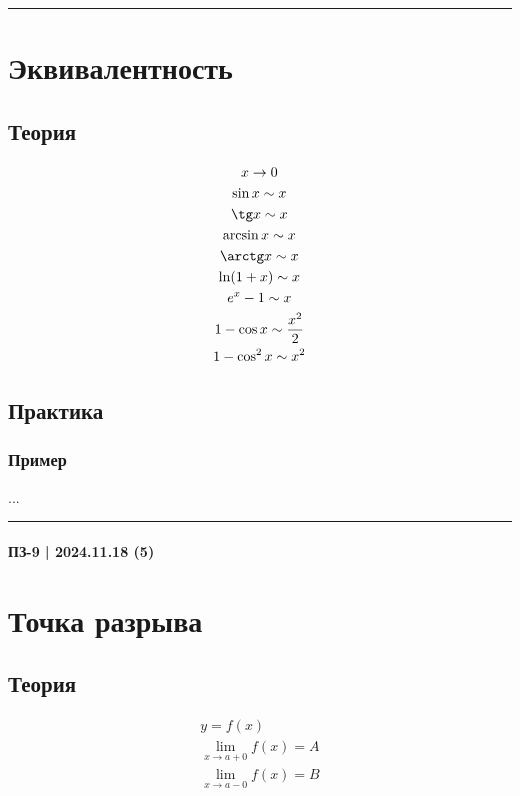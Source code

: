 \documentclass{article}
\begin{document}
\par\noindent\rule{\textwidth}{1pt}
\section{Эквивалентность}

\subsection{Теория}
\begin{gather*}
    x \to 0 \\
    \sin x       \sim x \\
    \tg x        \sim x \\
    \arcsin x    \sim x \\
    \arctg x     \sim x \\
    \ln(1 + x)   \sim x \\
    e^x - 1      \sim x \\
    1 - \cos x   \sim \frac{x^2}{2} \\
    1 - \cos^2 x \sim x^2
\end{gather*}


\subsection{Практика}

\subsubsection{Пример}
...



\par\noindent\rule{\textwidth}{1pt}
\paragraph{ПЗ-9 | 2024.11.18 (5)}
\section{Точка разрыва}

\subsection{Теория}

\begin{gather*}
    y = f(x) \\
    \lim_{x \to a + 0} f(x) = A \\
    \lim_{x \to a -  0} f(x) = B
\end{gather*}
\end{document}
